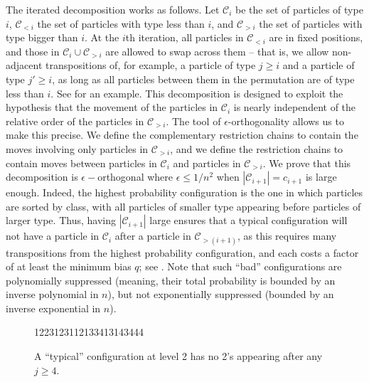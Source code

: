 \documentclass{toc}
\begin{document}
The iterated decomposition works as follows. Let $\mathcal{C}_{i}$ be 
the set of particles of type $i$, $\mathcal{C}_{<i}$ the set of 
particles with type less than $i$, and $\mathcal{C}_{>i}$ the set of 
particles with type bigger than $i$. At the $i$th iteration, all 
particles in $\mathcal{C}_{<i}$ are in fixed positions, and those in 
$\mathcal{C}_{i}\cup \mathcal{C}_{>i}$ are allowed to swap across them
-- that is, we allow non-adjacent transpositions of, for example, a particle 
of type $j\geq i$ and a particle of type $j'\geq i$, as long as all particles 
between them in the permutation are of type less than $i$. %
%
%
%
See 
for an example.  %
This decomposition is designed to 
exploit the hypothesis that the movement of the particles in 
$\mathcal{C}_{i}$ is nearly independent of the relative order of the 
particles in $\mathcal{C}_{>i}$.  The tool of $\epsilon$-orthogonality 
allows us to make this precise.  We define the complementary 
restriction chains to contain the moves involving only particles in 
$\mathcal{C}_{>i}$, and we define the restriction chains to contain 
moves between particles in $\mathcal{C}_{i}$ and particles in 
$\mathcal{C}_{>i}$. We prove that this decomposition is 
%
$\epsilon-$orthogonal where $\epsilon\leq 1/n^2$ %
when $|\mathcal{C}_{i+1}| = c_{i+1}$ is large 
enough.  Indeed, the highest probability configuration is the one in 
which particles are sorted by class, with all particles of smaller type 
appearing before particles of larger type.  Thus, having 
$|\mathcal{C}_{i+1}|$ large ensures that a typical configuration will 
not have a particle in $\mathcal{C}_{i}$ after a particle in 
$\mathcal{C}_{>(i+1)}$, as this requires many transpositions from the 
highest probability configuration, and each costs a factor of at least 
the minimum bias $q$; see .  Note that such 
``bad'' configurations are polynomially suppressed 
(meaning, their total probability is bounded by an inverse polynomial in $n$), %
but not exponentially suppressed
(bounded by an inverse exponential in $n$).  %
%
%

\begin{figure}[]
  \centering
           \newcommand{\one}{{\color{gray}1}}
         {\color{red} \one 223\one 23\one \one 2\one 334\one 3\one 43444}\\
      \caption{A ``typical'' configuration at level 2 has no 2's appearing after any $j\geq 4$.}
\label{fig:typical}
\end{figure}
\end{document}
